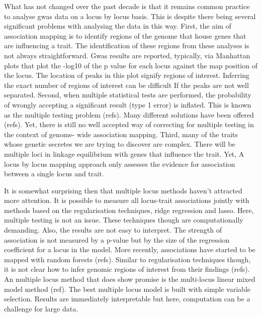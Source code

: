 \documentclass[12pt]{article}
\begin{document}
What has not changed over the past decade is that it remains common practice to analyse gwas data on a locus by locus basis. This is despite there being several significant problems with analysing the data in this way. First, the aim of association mapping is to identify regions of the genome that house genes that are influencing a trait. The identification of these regions from these analyses is not always straightforward. Gwas results are reported, typically, via Manhattan plots that plot the -log10 of the p value for each locus against the map position of the locus. The location of peaks in this plot signify regions of interest. Inferring the exact number of regions of interest can be difficult If the peaks are not well separated. Second, when multiple statistical tests are performed, the probability of wrongly accepting a significant result (type 1 error) is inflated. This is known as the multiple testing problem (refs). Many different solutions have been offered (refs). Yet, there is still no well accepted way of correcting for multiple testing in the context of genome- wide association mapping. Third, many of the traits whose genetic secretes we are trying to discover are complex. There will be multiple loci in linkage equilibrium with genes that influence the trait. Yet, A locus by locus mapping approach only assesses the evidence for association between a single locus and trait.

It is somewhat surprising then that multiple locus methods haven't attracted more attention. It is possible to measure all locus-trait associations jointly with methods based on the regularisation techniques, ridge regression and lasso. Here, multiple testing is not an issue. These techniques though are computationally demanding. Also, the results are not easy to interpret. The strength of association is not measured by a p-value but by the size of the regression coefficient for a locus in the model. More recently, associations have started to be mapped with random forests (refs). Similar to regularisation techniques though, it is not clear how to infer genomic regions of interest from their findings (refs). An multiple locus method that does show promise is the multi-locus linear mixed model method (ref). The best multiple locus model is built with simple variable selection. Results are immediately interpretable but here, computation can be a challenge for large data.
\end{document}
